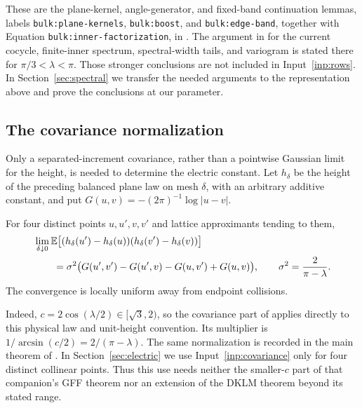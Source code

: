 These are the plane-kernel, angle-generator, and fixed-band
continuation lemmas, labels \texttt{bulk:plane-kernels},
\texttt{bulk:boost}, and \texttt{bulk:edge-band}, together with
Equation \texttt{bulk:inner-factorization}, in
\cite[Section ``Angular transfer and its two leading modes'']{FKCompanion}.
The argument in \cite[Section~4]{GFFCompanion} for the current
cocycle, finite-inner spectrum, spectral-width tails, and variogram
is stated there for $\pi/3<\lambda<\pi$. Those stronger conclusions
are not included in Input~\ref{inp:rows}. In
Section~\ref{sec:spectral} we transfer the needed arguments to the
representation above and prove the conclusions at our parameter.

\subsection{The covariance normalization}

Only a separated-increment covariance, rather than a pointwise
Gaussian limit for the height, is needed to determine the electric
constant. Let $h_\delta$ be the height of the preceding balanced plane
law on mesh $\delta$, with an arbitrary additive constant, and put
$G(u,v)=-(2\pi)^{-1}\log|u-v|$.

\begin{standinginput}\label{inp:covariance}
For four distinct points $u,u',v,v'$ and lattice approximants tending
to them,
\begin{align*}
 &\lim_{\delta\downarrow0}
 \mathbb E\bigl[(h_\delta(u')-h_\delta(u))
          (h_\delta(v')-h_\delta(v))\bigr]\\
 &\qquad=\sigma^2\bigl(G(u',v')-G(u',v)-G(u,v')+G(u,v)\bigr),
 \qquad \sigma^2=\frac{2}{\pi-\lambda}.
\end{align*}
The convergence is locally uniform away from endpoint collisions.
\end{standinginput}

Indeed, $c=2\cos(\lambda/2)\in[\sqrt3,2)$, so the covariance
part of \cite[Definition~2.7 and Theorem~2.8]{DKLM} applies directly
to this physical law and unit-height convention. Its multiplier is
$1/\arcsin(c/2)=2/(\pi-\lambda)$. The same normalization is recorded
in the main theorem of \cite{GFFCompanion}. In
Section~\ref{sec:electric} we use Input~\ref{inp:covariance} only
for four distinct collinear points. Thus this use needs neither the
smaller-$c$ part of that companion's GFF theorem nor an extension
of the DKLM theorem beyond its stated range.
